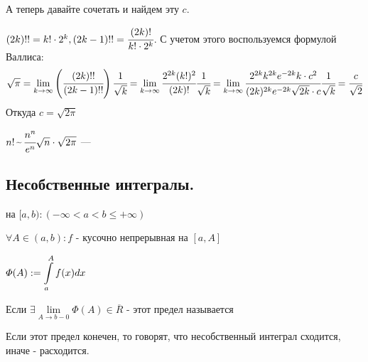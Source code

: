 А теперь давайте сочетать и найдем эту $c$.

$(2k)!! = k!\cdot 2^k, (2k-1)!! = \cfrac{(2k)!}{k!\cdot2^k}$. С учетом этого воспользуемся формулой Валлиса:
$$\sqrt{\pi} = \lim\limits_{k\rightarrow\infty}\left(\cfrac{(2k)!!}{(2k-1)!!}\right)\cfrac{1}{\sqrt{k}}=\lim_{k\rightarrow \infty}\cfrac{2^{2k}(k!)^2}{(2k)!}\cfrac{1}{\sqrt{k}} = \lim_{k\rightarrow \infty} \cfrac{2^{2k}k^{2k}e^{-2k}k\cdot c^2}{(2k)^{2k}e^{-2k}\sqrt{2k}\cdot c}\cfrac{1}{\sqrt{k}} = \cfrac{c}{\sqrt{2}}$$
Откуда $c = \sqrt{2\pi}$

$n!\, \mytilde\, \cfrac{n^n}{e^n}\sqrt{n}\cdot \sqrt{2\pi}$ --- 

\newpage 
\subsection{Несобственные интегралы.}

  на $[a,b): (-\infty<a<b\leq + \infty)$

$\forall A \in (a,b): f$ - кусочно непрерывная на $[a,A]$

 $\varPhi(A):= \displaystyle\int\limits_{a}^{A}f(x) dx$

Если $\exists \lim\limits_{A \rightarrow b -0} \varPhi(A) \in \overline{R}$ - этот предел называется 

Если этот предел конечен, то говорят, что несобственный интеграл сходится, иначе  - расходится.


